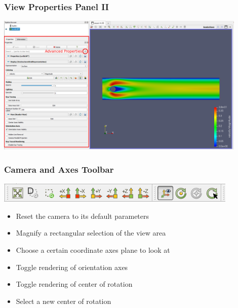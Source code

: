 \begin{frame}
  \frametitle{View Properties Panel II}
  \begin{center}
    \includegraphics[width=0.9\textwidth]{screenshots/properties-1.png}
  \end{center}
\end{frame}

\begin{frame}
  \frametitle{Camera and Axes Toolbar}

  \includegraphics[width=\textwidth]{screenshots/camerabar.png}

    \begin{itemize}
      \item Reset the camera to its default parameters
      \item Magnify a rectangular selection of the view area
      \item Choose a certain coordinate axes plane to look at
      \item Toggle rendering of orientation axes 
      \item Toggle rendering of center of rotation 
      \item Select a new center of rotation 
    \end{itemize}
\end{frame}

